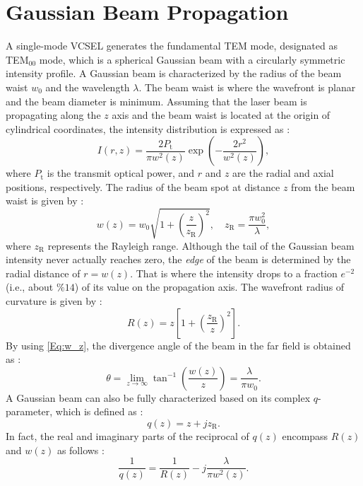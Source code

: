 \documentclass[lettersize,journal]{IEEEtran}
\begin{document}
\section{Gaussian Beam Propagation} \label{BeamModel}
A single-mode \ac{VCSEL} generates the fundamental \ac{TEM} mode, designated as TEM$_{00}$ mode, which is a spherical Gaussian beam with a circularly symmetric intensity profile. A Gaussian beam is characterized by the radius of the beam waist $w_0$ and the wavelength $\lambda$. The beam waist is where the wavefront is planar and the beam diameter is minimum. Assuming that the laser beam is propagating along the $z$ axis and the beam waist is located at the origin of cylindrical coordinates, the intensity distribution is expressed as \cite[p.~84]{Saleh2019}:
%
\begin{equation}
	I(r,z) = \frac{2P_\mathrm{t}}{\pi w^2(z)}{\exp{\left(-\dfrac{2r^2}{w^2(z)} \right)}} ,
	\label{Eq:I_G}
\end{equation}
%
where $P_\mathrm{t}$ is the transmit optical power, and $r$ and $z$ are the radial and axial positions, respectively. The radius of the beam spot at distance $z$ from the beam waist is given by \cite[p.~82]{Saleh2019}:
%
\begin{equation}
    w(z) = w_0 \sqrt{1+ {\left(\dfrac{z}{z_\mathrm{R}}\right)}^2}, \quad z_\mathrm{R}=\dfrac{\pi {w^2_0}}{\lambda},
    \label{Eq:w_z}
\end{equation}
%
where $z_\mathrm{R}$ represents the Rayleigh range.
%
Although the tail of the Gaussian beam intensity never actually reaches zero, the \textit{edge} of the beam is determined by the radial distance of $r = w(z)$. That is where the intensity drops to a fraction $e^{-2}$ (i.e., about $\%14$) of its value on the propagation axis. The wavefront radius of curvature is given by \cite[p.~82]{Saleh2019}:
%
\begin{equation}
    R(z) = z \left[ 1+ {\left( \dfrac{z_\mathrm{R}}{z}\right)}^2 \right].
    \label{Eq:R_z}
\end{equation}
%
By using \eqref{Eq:w_z}, the divergence angle of the beam in the far field is obtained as \cite[p.~85]{Saleh2019}:
%
\begin{equation}
	\theta = \lim_{z \to \infty} \tan^{-1}\left(\frac{w(z)}{z}\right) = \frac{\lambda}{\pi w_0} .
	\label{Eq:2_5}
\end{equation}
%
A Gaussian beam can also be fully characterized based on its complex $q$-parameter, which is defined as \cite[p.~81]{Saleh2019}:
%
\begin{equation}
    q(z) = z + jz_\mathrm{R}.
    \label{Eq:q}
\end{equation}
In fact, the real and imaginary parts of the reciprocal of $q(z)$ encompass $R(z)$ and $w(z)$ as follows \cite[p.~81]{Saleh2019}:
%
\begin{equation}
\frac{1}{q(z)}=\frac{1}{R(z)}-j\frac{\lambda}{\pi w^2(z)} .
\label{Eq:q_inverse}
\end{equation}
\end{document}
